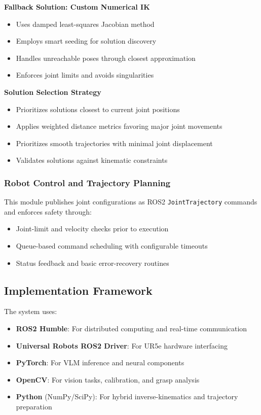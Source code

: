 \documentclass[conference]{IEEEtran}
\begin{document}
\textbf{Fallback Solution: Custom Numerical IK}
\begin{itemize}
    \item Uses damped least-squares Jacobian method
    \item Employs smart seeding for solution discovery
    \item Handles unreachable poses through closest approximation
    \item Enforces joint limits and avoids singularities
\end{itemize}

\textbf{Solution Selection Strategy}
\begin{itemize}
    \item Prioritizes solutions closest to current joint positions
    \item Applies weighted distance metrics favoring major joint movements
    \item Prioritizes smooth trajectories with minimal joint displacement
    \item Validates solutions against kinematic constraints
\end{itemize}

\subsubsection{Robot Control and Trajectory Planning}
This module publishes joint configurations as ROS2 \texttt{JointTrajectory} commands and enforces safety through:
\begin{itemize}
    \item Joint-limit and velocity checks prior to execution
    \item Queue-based command scheduling with configurable timeouts
    \item Status feedback and basic error-recovery routines
\end{itemize}

\subsection{Implementation Framework}
The system uses:
\begin{itemize}
    \item \textbf{ROS2 Humble}: For distributed computing and real-time communication
    \item \textbf{Universal Robots ROS2 Driver}: For UR5e hardware interfacing
    \item \textbf{PyTorch}: For VLM inference and neural components
    \item \textbf{OpenCV}: For vision tasks, calibration, and grasp analysis
    \item \textbf{Python} (NumPy/SciPy): For hybrid inverse-kinematics and trajectory preparation
\end{itemize}
\end{document}

